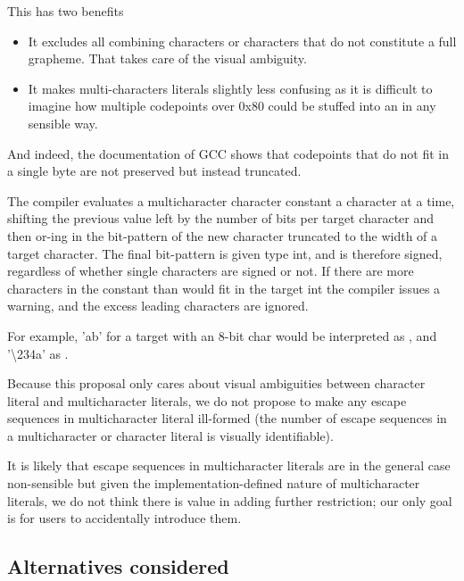 \documentclass{wg21}
\begin{document}
    This has two benefits
    \begin{itemize}
        \item It excludes all combining characters or characters that do not constitute a full grapheme. That takes care of the visual ambiguity.
        \item It makes multi-characters literals slightly less confusing as it is difficult to imagine how multiple codepoints over 0x80 could be stuffed into an  in any sensible way.
    \end{itemize}
    And indeed, the documentation of GCC shows that codepoints that do not fit in a single byte are not preserved but instead truncated.
    \begin{quoteblock}
        The compiler evaluates a multicharacter character constant a character at a time, shifting the previous value left by the number of bits per target character and then or-ing in the bit-pattern of the new character truncated to the width of a target character. The final bit-pattern is given type int, and is therefore signed, regardless of whether single characters are signed or not. If there are more characters in the constant than would fit in the target int the compiler issues a warning, and the excess leading characters are ignored.
        
        For example, 'ab' for a target with an 8-bit char would be interpreted as , and '\textbackslash 234a' as .
    \end{quoteblock}
    
    Because this proposal only cares about visual ambiguities between character literal and multicharacter literals, we do not propose to
    make any escape sequences in multicharacter literal ill-formed (the number of escape sequences in a multicharacter or character literal is visually identifiable).
    
    It is likely that escape sequences in multicharacter literals are in the general case non-sensible but given the implementation-defined nature of
    multicharacter literals, we do not think there is value in adding further restriction; our only goal is for users to accidentally introduce them.
    
    \subsection{Alternatives considered}
    
\end{document}
